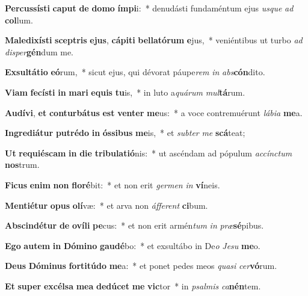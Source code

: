 \item \textbf{Per}\textbf{cus}\textbf{sís}\textbf{ti} \textbf{ca}\textbf{put} \textbf{de} \textbf{do}\textbf{mo} \textbf{ím}\textbf{pi}i:~* denudásti fundaméntum ejus \textit{us}\textit{que} \textit{ad} \textbf{col}lum.
\item \textbf{Ma}\textbf{le}\textbf{di}\textbf{xís}\textbf{ti} \textbf{scep}\textbf{tris} \textbf{e}\textbf{jus}, \textbf{cá}\textbf{pi}\textbf{ti} \textbf{bel}\textbf{la}\textbf{tó}\textbf{rum} \textbf{e}jus,~* veniéntibus ut turbo \textit{ad} \textit{di}\textit{sper}\textbf{gén}dum me.
\item \textbf{Ex}\textbf{sul}\textbf{tá}\textbf{ti}\textbf{o} \textbf{e}\textbf{ó}rum,~* sicut ejus, qui dévorat páupe\textit{rem} \textit{in} \textit{abs}\textbf{cón}dito.
\item \textbf{Vi}\textbf{am} \textbf{fe}\textbf{cís}\textbf{ti} \textbf{in} \textbf{ma}\textbf{ri} \textbf{e}\textbf{quis} \textbf{tu}is,~* in luto a\textit{quá}\textit{rum} \textit{mul}\textbf{tá}rum.
\item \textbf{Au}\textbf{dí}\textbf{vi}, \textbf{et} \textbf{con}\textbf{tur}\textbf{bá}\textbf{tus} \textbf{est} \textbf{ven}\textbf{ter} \textbf{me}us:~* a voce contremuérunt \textit{lá}\textit{bi}\textit{a} \textbf{me}a.
\item \textbf{In}\textbf{gre}\textbf{di}\textbf{á}\textbf{tur} \textbf{pu}\textbf{tré}\textbf{do} \textbf{in} \textbf{ós}\textbf{si}\textbf{bus} \textbf{me}is,~* et \textit{sub}\textit{ter} \textit{me} \textbf{scá}teat;
\item \textbf{Ut} \textbf{re}\textbf{qui}\textbf{és}\textbf{cam} \textbf{in} \textbf{di}\textbf{e} \textbf{tri}\textbf{bu}\textbf{la}\textbf{ti}\textbf{ó}nis:~* ut ascéndam ad pópulum \textit{ac}\textit{cínc}\textit{tum} \textbf{nos}trum.
\item \textbf{Fi}\textbf{cus} \textbf{e}\textbf{nim} \textbf{non} \textbf{flo}\textbf{ré}bit:~* et non erit \textit{ger}\textit{men} \textit{in} \textbf{ví}neis.
\item \textbf{Men}\textbf{ti}\textbf{é}\textbf{tur} \textbf{o}\textbf{pus} \textbf{o}\textbf{lí}væ:~* et arva non \textit{áf}\textit{fe}\textit{rent} \textbf{ci}bum.
\item \textbf{Ab}\textbf{scin}\textbf{dé}\textbf{tur} \textbf{de} \textbf{o}\textbf{ví}\textbf{li} \textbf{pe}cus:~* et non erit armén\textit{tum} \textit{in} \textit{præ}\textbf{sé}pibus.
\item \textbf{E}\textbf{go} \textbf{au}\textbf{tem} \textbf{in} \textbf{Dó}\textbf{mi}\textbf{no} \textbf{gau}\textbf{dé}bo:~* et exsultábo in De\textit{o} \textit{Je}\textit{su} \textbf{me}o.
\item \textbf{De}\textbf{us} \textbf{Dó}\textbf{mi}\textbf{nus} \textbf{for}\textbf{ti}\textbf{tú}\textbf{do} \textbf{me}a:~* et ponet pedes meos \textit{qua}\textit{si} \textit{cer}\textbf{vó}rum.
\item \textbf{Et} \textbf{su}\textbf{per} \textbf{ex}\textbf{cél}\textbf{sa} \textbf{me}\textbf{a} \textbf{de}\textbf{dú}\textbf{cet} \textbf{me} \textbf{vic}tor~* in \textit{psal}\textit{mis} \textit{ca}\textbf{nén}tem.
